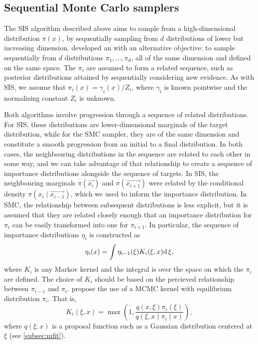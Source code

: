 \subsection{Sequential Monte Carlo samplers}

The \gls{SIS} algorithm described above aims to sample from a high-dimensional
distribution $\pi(x)$, by sequentially sampling from $d$ distributions of lower
but increasing dimension. \textcite{del2006sequential} developed an
 with an alternative objective: to sample sequentially
from $d$ distributions $\pi_1, \ldots, \pi_d$, all of the same dimension and
defined on the same space. The $\pi_i$ are assumed to form a related sequence,
such as posterior distributions attained by sequentially considering new
evidence. As with \gls{SIS}, we assume that $\pi_i(x) = \gamma_i(x) / Z_i$,
where $\gamma_i$ is known pointwise and the normalizing constant $Z_i$ is
unknown.

Both algorithms involve progression through a sequence of related
distributions. For \gls{SIS}, these distributions are lower-dimensional
marginals of the target distribution, while for the \gls{SMC} sampler, they are
of the same dimension and constitute a smooth progression from an initial to a
final distribution. In both cases, the neighbouring distributions in the
sequence are related to each other in some way, and we can take advantage of
that relationship to create a sequence of importance distributions alongside
the sequence of targets. In \gls{SIS}, the neighbouring marginals
$\pi(\vec{x_i})$ and $\pi(\vec{x_{i+1}})$ were related by the conditional
density $\pi(x_i \mid \vec{x_{i-1}})$, which we used to inform the importance
distribution. In \gls{SMC}, the relationship between subsequent distributions
is less explicit, but it is assumed that they are related closely enough that
an importance distribution for $\pi_i$ can be easily transformed into one for
$\pi_{i+1}$. In particular, the sequence of importance distributions $\eta_i$
is constructed as
\begin{align}
  \label{eq:impint}
  \eta_i(x) = \int \eta_{i-1}(\xi) K_i(\xi, x) \mathrm{d}\,\xi,
\end{align}
where $K_i$ is any Markov kernel and the integral is over the space on which the
$\pi_i$ are defined. The choice of $K_i$ should be based on the percieved
relationship between $\pi_{i-1}$ and $\pi_i$. \textcite{del2006sequential}
propose the use of a \gls{MCMC} kernel with equilibrium distribution $\pi_i$.
That is,
\[
  K_i(\xi, x) = \max\left(1, \frac{q(x, \xi)\pi_i(\xi)}{q(\xi, x)\pi_i(x)}\right),
\]
where $q(\xi, x)$ is a proposal function such as a Gaussian distribution
centered at $\xi$ (see \cref{subsec:mfit}). 


